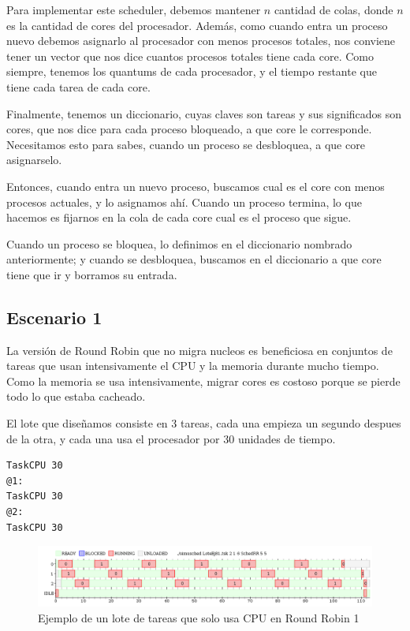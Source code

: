 

Para implementar este scheduler, debemos mantener $n$ cantidad de colas, donde $n$ es la cantidad de cores del procesador. Además, como cuando entra un proceso nuevo debemos asignarlo al procesador con menos procesos totales, nos conviene tener un vector que nos dice cuantos procesos totales tiene cada core. Como siempre, tenemos los quantums de cada procesador, y el tiempo restante que tiene cada tarea de cada core. 

Finalmente, tenemos un diccionario, cuyas claves son tareas y sus significados son cores, que nos dice para cada proceso bloqueado, a que core le corresponde. Necesitamos esto para sabes, cuando un proceso se desbloquea, a que core asignarselo.

Entonces, cuando entra un nuevo proceso, buscamos cual es el core con menos procesos actuales, y lo asignamos ahí. Cuando un proceso termina, lo que hacemos es fijarnos en la cola de cada core cual es el proceso que sigue.

Cuando un proceso se bloquea, lo definimos en el diccionario nombrado anteriormente; y cuando se desbloquea, buscamos en el diccionario a que core tiene que ir y borramos su entrada.

\subsection{Escenario 1}

La versión de Round Robin que no migra nucleos es beneficiosa en conjuntos de tareas que usan intensivamente el CPU y la memoria durante mucho tiempo. Como la memoria se usa intensivamente, migrar cores es costoso porque se pierde todo lo que estaba cacheado. 

El lote que diseñamos consiste en 3 tareas, cada una empieza un segundo despues de la otra, y cada una usa el procesador por 30 unidades de tiempo.

\begin{lstlisting}
TaskCPU 30
@1:
TaskCPU 30
@2:
TaskCPU 30
\end{lstlisting}


\begin{figure}[H]
\caption{Ejemplo de un lote de tareas que solo usa CPU en Round Robin 1}
\label{fig:ej8-11}
\includegraphics[width=1\textwidth]{imgs/ej8-1rr.png}
\end{figure}

